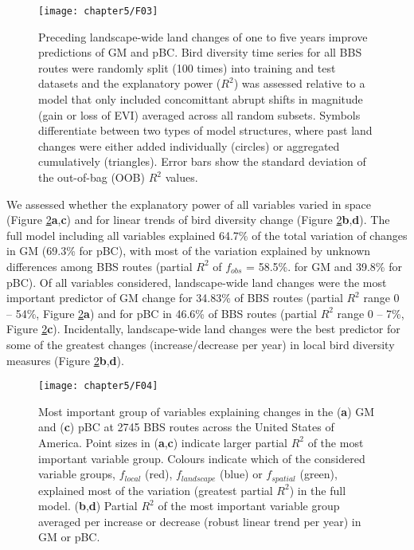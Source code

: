 \begin{figure}[htb]
\centering
\texttt{[image: chapter5/F03]}
\caption{Preceding landscape-wide land changes of one to five years improve predictions of GM and pBC. Bird diversity time series for all BBS routes were randomly split (100 times) into training and test datasets and the explanatory power ($R^2$) was assessed relative to a model that only included concomittant abrupt shifts in magnitude (gain or loss of EVI) averaged across all random subsets. Symbols differentiate between two types of model structures, where past land changes were either added individually (circles) or aggregated cumulatively (triangles). Error bars show the standard deviation of the out-of-bag (OOB) $R^2$ values. }
\label{F05_03}
\end{figure}

We assessed whether the explanatory power of all variables varied in space (Figure \ref{F05_04}\textbf{a},\textbf{c}) and for linear trends of bird diversity change (Figure \ref{F05_04}\textbf{b},\textbf{d}). The full model including all variables explained 64.7\% of the total variation of changes in GM (69.3\% for pBC), with most of the variation explained by unknown differences among BBS routes (partial $R^2$ of $f_{obs}$ = 58.5\%. for GM and 39.8\% for pBC). Of all variables considered, landscape-wide land changes were the most important predictor of GM change for 34.83\% of BBS routes (partial $R^2$ range 0 – 54\%, Figure \ref{F05_04}\textbf{a}) and for pBC in 46.6\% of BBS routes (partial $R^2$ range 0 – 7\%, Figure \ref{F05_04}\textbf{c}). Incidentally, landscape-wide land changes were the best predictor for some of the greatest changes (increase/decrease per year) in local bird diversity measures (Figure \ref{F05_04}\textbf{b},\textbf{d}).

\begin{figure}[htb]
\centering
\texttt{[image: chapter5/F04]}
\caption{Most important group of variables explaining changes in the (\textbf{a}) GM and (\textbf{c}) pBC at 2745 BBS routes across the United States of America. Point sizes in (\textbf{a},\textbf{c}) indicate larger partial $R^2$ of the most important variable group. Colours indicate which of the considered variable groups, $f_{local}$ (red), $f_{landscape}$ (blue) or $f_{spatial}$ (green), explained most of the variation (greatest partial $R^2$) in the full model. (\textbf{b},\textbf{d}) Partial $R^2$ of the most important variable group averaged per increase or decrease (robust linear trend per year) in GM or pBC.  }
\label{F05_04}
\end{figure}

